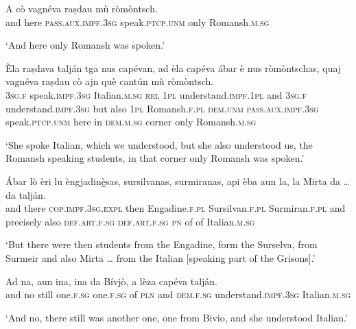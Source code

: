 \begin{linenumbers}
\gll    A cò vagnéva raṣdau mù ròmòntsch.\\
and here \textsc{pass.aux.impf.3sg} speak.\textsc{ptcp.unm} only Romansh.\textsc{m.sg}\\
\end{linenumbers}
\medskip
\glt `And here only Romansh was spoken.'
\medskip

\begin{linenumbers}
\gll    Èla raṣdava talján tga nus capévan, ad èla capéva ábar è nus ròmòntschas, quaj vagnéva raṣdau cò ajn què cantún mù ròmòntsch.\\
 \textsc{3sg.f} speak.\textsc{impf.3sg} Italian.\textsc{m.sg} \textsc{rel} \textsc{1pl} understand.\textsc{impf.1pl} and \textsc{3sg.f} understand.\textsc{impf.3sg} but also \textsc{1pl} Romansh.\textsc{f.pl} \textsc{dem.unm} \textsc{pass.aux.impf.3sg} speak.\textsc{ptcp.unm} here in  \textsc{dem.m.sg} corner only Romansh.\textsc{m.sg}\\
\end{linenumbers}
\medskip
\glt `She spoke Italian, which we understood, but she also understood us, the Romansh speaking students, in that corner only Romansh was spoken.'
\medskip

\begin{linenumbers}
\gll    Ábar lò èri lu  èngjadin\underline{è}sas, sursilvanas, surmiranas, api èba aun la, la Mirta da … da talján.\\
and there \textsc{cop.impf.3sg.expl} then Engadine.\textsc{f.pl} Sursilvan.\textsc{f.pl} Surmiran.\textsc{f.pl} and precisely also \textsc{def.art.f.sg} \textsc{def.art.f.sg} \textsc{pn} of {} of Italian.\textsc{m.sg}\\
\end{linenumbers}
\medskip
\glt `But there were then students from the Engadine, form the Surselva, from Surmeir and also Mirta … from the Italian [speaking part of the Grisons].'
\medskip

\begin{linenumbers}
\gll    Ad na, aun ina, ina da Bívjò, a lèza capéva talján.\\
and no still one.\textsc{f.sg} one.\textsc{f.sg} of \textsc{pln} and \textsc{dem.f.sg} understand.\textsc{impf.3sg} Italian.\textsc{m.sg}\\
\end{linenumbers}
\medskip
\glt `And no, there still was another one, one from Bivio, and she understood Italian.'
\medskip

